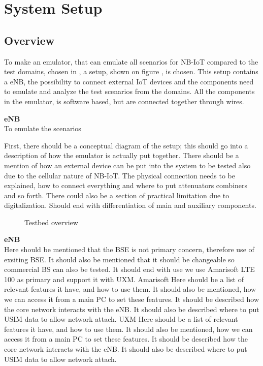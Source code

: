 \chapter{System Setup}

\section{Overview}

To make an emulator, that can emulate all scenarios for NB-IoT compared to the test domains, chosen in , a setup, shown on figure , is chosen. This setup contains a \gls{eNB}, the possibility to connect external IoT devices and the components need to emulate and analyze the test scenarios from the domains. All the components in the emulator, is software based, but are connected together through wires.


\textbf{eNB}\\


To emulate the scenarios 

First, there should be a conceptual diagram of the setup; this should go into a description of how the emulator is actually put together. 
There should be a mention of how an external device can be put into the system to be tested also due to the cellular nature of NB-IoT.
The physical connection needs to be explained, how to connect everything and where to put attenuators combiners and so forth.
There could also be a section of practical limitation due to digitalization.
Should end with differentiation of main and auxiliary components.

\begin{figure}[H]
\centering
\resizebox{0.5\textwidth}{!}{
}
\caption{Testbed overview}
\label{fig:test-bed_overview}
\end{figure}

\textbf{eNB}\\
Here should be mentioned that the BSE is not primary concern, therefore use of exsiting BSE. It should also be mentioned that it should be changeable so commercial BS can also be tested. It should end with use we use Amarisoft LTE 100 as primary and support it with UXM.
	Amarisoft
Here should be a list of relevant features it have, and how to use them. It should also be mentioned, how we can access it from a main PC to set these features. It should be described how the core network interacts with the eNB. It should also be described where to put USIM data to allow network attach.
	UXM
	Here should be a list of relevant features it have, and how to use them. It should also be mentioned, how we can access it from a main PC to set these features. It should be described how the core network interacts with the eNB. It should also be described where to put USIM data to allow network attach.

